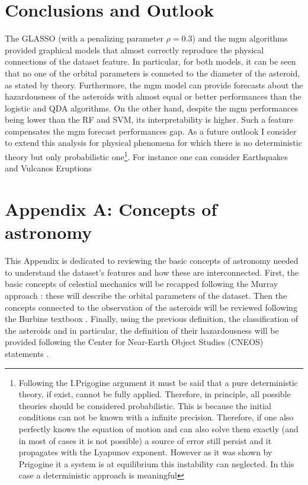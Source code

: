 \documentclass[12pt,%
               a4paper,%
               oneside,openany,%
               titlepage,%
               headinclude,footinclude,%
               BCOR5mm,%
               cleardoublepage=empty,%
               tablecaptionabove,%
               floatperchapter,
               ]{scrreprt}                 %
\begin{document}
\chapter{Conclusions and Outlook}

The GLASSO (with a penalizing parameter $\rho=0.3$) and the mgm algorithms provided graphical models that almost correctly reproduce the physical connections of the dataset feature. In particular, for both models, it can be seen that no one of the orbital parameters is conneted to the diameter of the asteroid, as stated by theory. Furthermore, the mgm model can provide forecasts about the hazardousness of the asteroids with almost equal or better performances than the logistic and QDA algorithms.  On the other hand, despite the mgm performances being lower than the RF and SVM, its interpretability is higher.  Such a feature compensates the mgm forecast performances gap. As a future outlook I consider to extend this analysis for physical phenomena for which there is no deterministic theory but only probabilistic one\footnote{Following the I.Prigogine \cite{prigogine2017non,prigogine1997end,nicolis1989exploring,prigogine1978time} argument it must be said that a pure deterministic theory, if exist, cannot be fully applied. Therefore, in principle, all possible theories should be considered probabilistic. This is because the initial conditions can not be known with a infinite precision. Therefore, if one also perfectly knows the equation of motion and can also solve them exactly (and in most of cases it is not possible) a source of error still persist and it propagates with the Lyapunov exponent. However as it was shown by Prigogine it a system is at equilibrium this instability can neglected. In this case a deterministic approach is meaningful }. For instance one can consider Earthquakes and Vulcanos Eruptions \cite{sornette1989self,sparks2003forecasting,sornette2006critical}

\chapter{Appendix A: Concepts of astronomy}

This Appendix is dedicated to reviewing the basic concepts of astronomy needed to understand the dataset's features and how these are interconnected. First, the basic concepts of celestial mechanics will be recapped following the Murray approach \cite{murray1999solar}: these will describe the orbital parameters of the dataset. Then the concepts connected to the observation of the asteroids will be reviewed following the Burbine textboox \cite{burbine2016asteroids}. Finally, using the previous definition, the classification of the asteroids and in particular, the definition of their hazardousness will be provided following the Center for Near-Earth Object Studies (CNEOS) statements \cite{nasa_classification}. 
\end{document}
